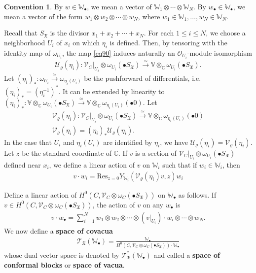 \documentclass[12pt,a4paper,notitlepage]{report}
\theoremstyle{definition}
\newtheorem{cv}[df]{Convention}
\theoremstyle{plain}
\newcommand{\fk}{\mathfrak}
\newcommand{\mc}{\mathcal}
\newcommand{\Res}{\mathrm{Res}}
\newcommand{\scr}{\mathscr}
\newcommand{\blt}{\bullet}
\newcommand{\Vbb}{\mathbb V}
\newcommand{\Wbb}{\mathbb W}
\newcommand{\Cbb}{\mathbb C}
\numberwithin{equation}{section}
\begin{document}
\begin{cv}
By $w\in\Wbb_\blt$, we mean a vector of $\Wbb_1\otimes\cdots\otimes \Wbb_N$. \index{w@$w_\blt,\Wbb_\blt$} By $w_\blt\in \Wbb_\blt$, we mean a vector of the form $w_1\otimes w_2\otimes\cdots\otimes w_N$, where $w_1\in \Wbb_1,\dots,w_N\in\Wbb_N$.
\end{cv}



Recall that $S_{\fk X}$ is the divisor $x_1+x_2+\cdots+x_N$. For each $1\leq i\leq N$, we choose a neighborhood $U_i$ of $x_i$ on which $\eta_i$ is defined. Then, by tensoring with the identity map of $\omega_{U_i}$,  the map \eqref{eq90} induces naturally an $\scr O_{U_i}$-module isomorphism 
\begin{align*}
\mc U_\varrho(\eta_i):\scr V_C|_{U_i}\otimes\omega_{U_i}(\blt S_{\fk X})\xrightarrow{\simeq}\Vbb\otimes_{\Cbb}\omega_{U_i}(\blt S_{\fk X}).
\end{align*}
Let $(\eta_i)_*:\omega_{U_i}\xrightarrow{\simeq}\omega_{\eta_i(U_i)}$  be the pushforward of differentials, i.e. $(\eta_i)_*=(\eta_i^{-1})^*$. It can be extended by linearity to $(\eta_i)_*:\Vbb\otimes_{\Cbb}\omega_{U_i}(\blt S_{\fk X})\xrightarrow{\simeq}\Vbb\otimes_{\Cbb}\omega_{\eta_i(U_i)}(\blt 0)$. Let
\begin{gather}
\mc V_\varrho(\eta_i):\scr V_C|_{U_i}\otimes\omega_{U_i}(\blt S_{\fk X})\xrightarrow{\simeq}\Vbb\otimes_{\Cbb}\omega_{\eta_i(U_i)}(\blt 0)\nonumber\\
\mc V_{\varrho}(\eta_i)=(\eta_i)_*\mc U_{\varrho}(\eta_i).\label{eq233}
\end{gather}
In the case that $U_i$ and $\eta_i(U_i)$ are identified by $\eta_i$, we have $\mc U_\varrho(\eta_i)=\mc V_\varrho(\eta_i)$. Let $z$ be the standard coordinate of $\Cbb$. If $v$ is a section of $\scr V_C|_{U_i}\otimes\omega_{U_i}(\blt S_{\fk X})$ defined near $x_i$, we define a linear action of $v$ on $\Wbb_i$ such that if $w_i\in\Wbb_i$, \index{vw@$v\cdot w_i,v\cdot w_\blt$} then
\begin{align}
\boxed{~~v\cdot w_i=\Res_{z=0}Y_{\Wbb_i}(\mc V_\varrho(\eta_i)v,z)w_i~~}\label{eq230}
\end{align}


Define a linear action of $H^0(C,\scr V_C\otimes\omega_C(\blt S_{\fk X}))$ on $\Wbb_\blt$ as follows.  
If $v\in H^0(C,\scr V_C\otimes\omega_C(\blt S_{\fk X}))$, the action of $v$ on any $w_\blt$ is
\begin{align}
v\cdot w_\blt=\sum_{i=1}^N w_1\otimes w_2\otimes\cdots \otimes (v|_{U_i})\cdot w_i \otimes\cdots\otimes w_N.\label{eq231}
\end{align}
We now define a \textbf{space of covacua} 
\begin{gather}
\scr T_{\fk X}(\Wbb_\blt)=\frac{\Wbb_\blt}{H^0(C,\scr V_C\otimes\omega_C(\blt S_{\fk X}))\cdot \Wbb_\blt}
\end{gather}
whose dual vector space is denoted by $\scr T_{\fk X}^*(\Wbb_\blt)$ \index{T@$\scr T_{\fk X}(\Wbb_\blt),\scr T_{\fk X}^*(\Wbb_\blt)$} and called a \textbf{space of conformal blocks} or \textbf{space of vacua}.
\end{document}
